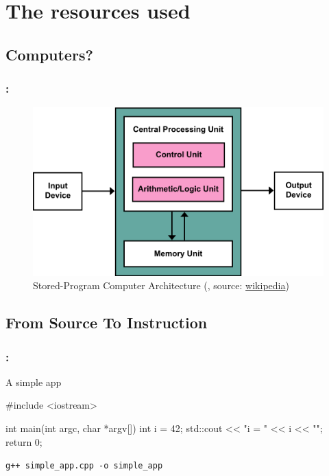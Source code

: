 \documentclass[9pt,xcolor=table]{beamer}
\begin{document}
\section[Resources]{The resources used}
\subsection{Computers?}
\begin{frame}[c]
\frametitle{\insertsectionhead{}: \insertsubsection{}}
\begin{figure}[htb]
\includegraphics[height=0.65\textheight]{img/Von_Neumann_Architecture}\\[12pt]\Large
Stored-Program Computer Architecture (\cite{VonNeumann}, source: \href{http://en.wikipedia.org/wiki/Von_Neumann_architecture}{wikipedia})
\end{figure}
\end{frame}

\subsection{From Source To Instruction}
\begin{frame}[fragile]
\frametitle{\insertsectionhead{}: \insertsubsection{}}
\begin{block}{A simple app}
  \small
  \begin{pyglist}[language=c++,numbers=left,style=emacs]
  #include <iostream>

  int main(int argc, char *argv[])
  {
    int i = 42;
    std::cout << "i = " << i << "\n";
    return 0;
  }
  \end{pyglist}
\end{block}
\pause
\begin{block}{\texttt{g++ simple\_app.cpp -o simple\_app}}
  \small
    
\end{block}
\end{frame}
\end{document}
